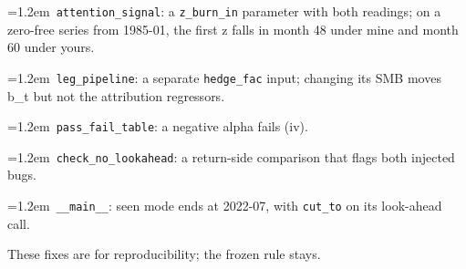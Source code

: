 \par\hangindent=1.2em\noindent\textbullet~\texttt{attention\_signal}: a \texttt{z\_burn\_in} parameter with both readings; on a zero-free series from 1985-01, the first z falls in month 48 under mine and month 60 under yours.
\par\hangindent=1.2em\noindent\textbullet~\texttt{leg\_pipeline}: a separate \texttt{hedge\_fac} input; changing its SMB moves b\_t but not the attribution regressors.
\par\hangindent=1.2em\noindent\textbullet~\texttt{pass\_fail\_table}: a negative alpha fails (iv).
\par\hangindent=1.2em\noindent\textbullet~\texttt{check\_no\_lookahead}: a return-side comparison that flags both injected bugs.
\par\hangindent=1.2em\noindent\textbullet~\texttt{\_\_main\_\_}: seen mode ends at 2022-07, with \texttt{cut\_to} on its look-ahead call.
\medskip
\par\noindent These fixes are for reproducibility; the frozen rule stays.
